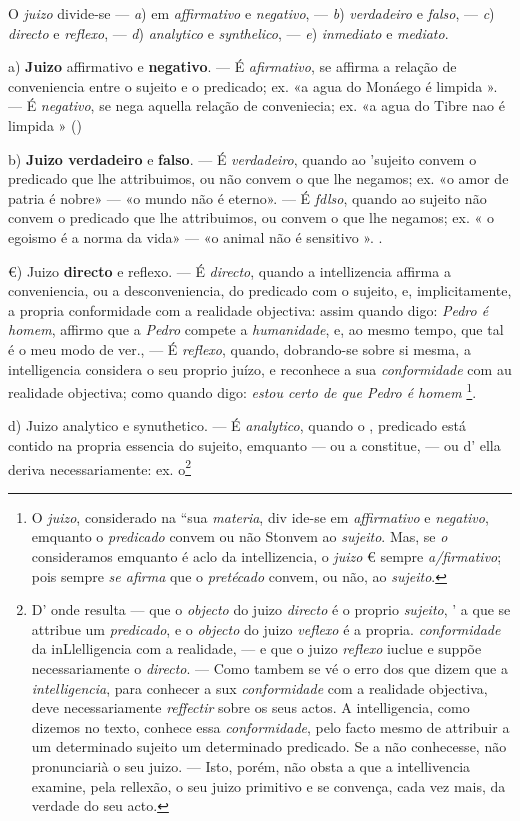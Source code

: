 
 
O \emph{juizo} divide-se --- \emph{a}) em \emph{affirmativo} e \emph{negativo}, --- \emph{b}) \emph{verdadeiro} e \emph{falso}, --- \emph{c}) \emph{directo} e \emph{reflexo}, --- \emph{d}) \emph{analytico} e \emph{synthelico}, --- \emph{e}) \emph{inmediato} e \emph{mediato}.

a) \textbf{Juizo} affirmativo e \textbf{negativo}. --- É \emph{afirmativo}, se affirma a relação de conveniencia entre o sujeito e o predicado; ex. «a agua do Monáego é limpida ». --- É \emph{negativo}, se nega aquella relação de conveniecia; ex. «a agua do Tibre nao é limpida » ()

b) \textbf{Juizo verdadeiro} e \textbf{falso}. --- É \emph{verdadeiro}, quando ao 'sujeito convem o predicado que lhe attribuimos, ou não convem o que lhe negamos; ex. «o amor de patria é nobre» --- «o mundo não é eterno». --- É \emph{fdlso}, quando ao sujeito não convem o predicado que lhe attribuimos, ou convem o que lhe negamos; ex. « o egoismo é a norma da vida» --- «o animal não é sensitivo ». .

€) Juizo \textbf{directo} e reflexo. --- É \emph{directo}, quando a intellizencia affirma a conveniencia, ou a desconveniencia, do predicado com o sujeito, e, implicitamente, a propria conformidade com a realidade objectiva: assim quando digo: \emph{Pedro é homem}, affirmo que a \emph{Pedro} compete a \emph{humanidade}, e, ao mesmo tempo, que tal é o meu modo de ver., --- É \emph{reflexo}, quando, dobrando-se sobre si mesma, a intelligencia considera o seu proprio juízo, e reconhece a sua \emph{conformidade} com au realidade objectiva; como quando digo: \emph{estou certo de que Pedro é homem} \footnote{O \emph{juizo}, considerado na “sua \emph{materia}, div ide-se em \emph{affirmativo} e \emph{negativo}, emquanto o \emph{predicado} convem ou não Stonvem ao \emph{sujeito}. Mas, se \emph{o} consideramos emquanto é aclo da intellizencia, o \emph{juizo} € sempre \emph{a/firmativo}; pois sempre \emph{se afirma} que o \emph{pretécado} convem, ou não, ao \emph{sujeito}.}.

d) Juizo analytico e synuthetico. --- É \emph{analytico}, quando o , predicado está contido na propria essencia do sujeito, emquanto --- ou a constitue, --- ou d' ella deriva necessariamente: ex. o\footnote{D' onde resulta --- que o \emph{objecto} do juizo \emph{directo} é o proprio \emph{sujeito}, ' a que se attribue um \emph{predicado}, e o \emph{objecto} do juizo \emph{veflexo} é a propria. \emph{conformidade} da inLlelligencia com a realidade, --- e que o juizo \emph{reflexo} iuclue e suppõe necessariamente o \emph{directo}. --- Como tambem se vé o erro dos que dizem que a \emph{intelligencia}, para conhecer a sux \emph{conformidade} com a realidade objectiva, deve necessariamente \emph{reffectir} sobre os seus actos. A intelligencia, como dizemos no texto, conhece essa \emph{conformidade}, pelo facto mesmo de attribuir a um determinado sujeito um determinado predicado. Se a não conhecesse, não pronunciarià o seu juizo. --- Isto, porém, não obsta a que a intellivencia examine, pela rellexão, o seu juizo primitivo e se convença, cada vez mais, da verdade do seu acto.}

